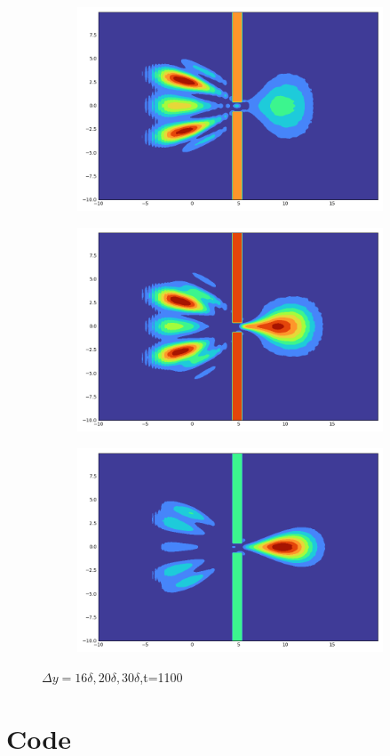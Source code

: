 \begin{figure}[h]
    \centering
    \begin{subfigure}{0.3\linewidth}
        \includegraphics[width=\linewidth]{5/8}
    \end{subfigure}
    \begin{subfigure}{0.3\linewidth}
        \includegraphics[width=\linewidth]{5/10}
    \end{subfigure}
    \begin{subfigure}{0.3\linewidth}
        \includegraphics[width=\linewidth]{5/15}
    \end{subfigure}
    \caption{$\Delta y=16\delta,20\delta,30\delta$,t=1100}
\end{figure}
\onecolumn
\section{Code}
\nolinenumbers

\linenumbers
\nolinenumbers

\linenumbers

